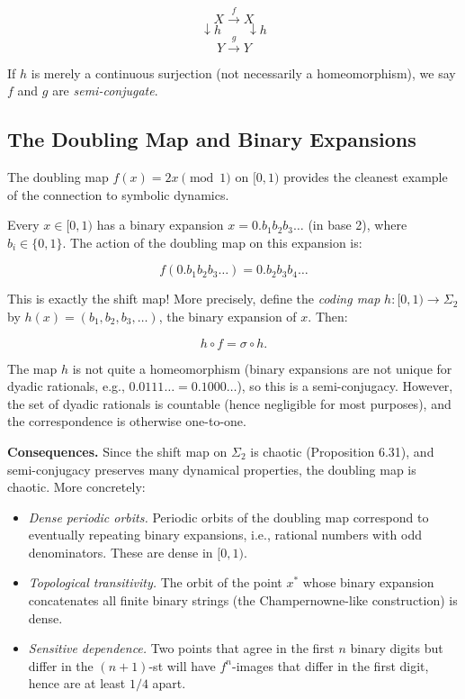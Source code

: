 \[
X \xrightarrow{f} X
\]
\[
\downarrow h \qquad \downarrow h
\]
\[
Y \xrightarrow{g} Y
\]

If $h$ is merely a continuous surjection (not necessarily a homeomorphism), we say $f$ and $g$ are \textit{semi-conjugate}.

\subsection{The Doubling Map and Binary Expansions}\label{sec:6.6.4}

The doubling map $f(x) = 2x \pmod{1}$ on $[0,1)$ provides the cleanest example of the connection to symbolic dynamics.

Every $x \in [0,1)$ has a binary expansion $x = 0.b_1 b_2 b_3 \ldots$ (in base 2), where $b_i \in \{0, 1\}$. The action of the doubling map on this expansion is:

\[
f(0.b_1 b_2 b_3 \ldots) = 0.b_2 b_3 b_4 \ldots
\]

This is exactly the shift map! More precisely, define the \textit{coding map} $h: [0,1) \to \Sigma_2$ by $h(x) = (b_1, b_2, b_3, \ldots)$, the binary expansion of $x$. Then:

\[
h \circ f = \sigma \circ h.
\]

The map $h$ is not quite a homeomorphism (binary expansions are not unique for dyadic rationals, e.g., $0.0111\ldots = 0.1000\ldots$), so this is a semi-conjugacy. However, the set of dyadic rationals is countable (hence negligible for most purposes), and the correspondence is otherwise one-to-one.

\textbf{Consequences.} Since the shift map on $\Sigma_2$ is chaotic (Proposition 6.31), and semi-conjugacy preserves many dynamical properties, the doubling map is chaotic. More concretely:

\begin{itemize}[nosep]
  \item \textit{Dense periodic orbits.} Periodic orbits of the doubling map correspond to eventually repeating binary expansions, i.e., rational numbers with odd denominators. These are dense in $[0,1)$.
  \item \textit{Topological transitivity.} The orbit of the point $x^*$ whose binary expansion concatenates all finite binary strings (the Champernowne-like construction) is dense.
  \item \textit{Sensitive dependence.} Two points that agree in the first $n$ binary digits but differ in the $(n+1)$-st will have $f^n$-images that differ in the first digit, hence are at least $1/4$ apart.
\end{itemize}

